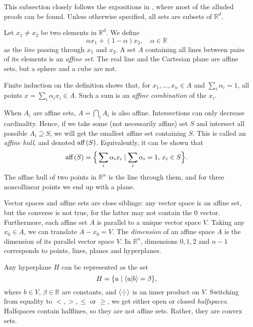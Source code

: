 		This subsection closely follows the expositions in \cite{rockafellar_convexanalysis_1970,grunbaum_convexpolytopes_2003,ziegler_lecturespolytopes_1995,boyd_convexoptimization_2004}, where most of the alluded proofs can be found. Unless otherwise specified, all sets are subsets of $\mathbb{R}^d$.

		Let $x_1 \neq x_2$ be two elements in $\mathbb{R}^d$. We define
		$$
			\alpha x_1 + (1 - \alpha) x_2, \quad\alpha \in \mathbb{R}
		$$
		as the \emph{line} passing through $x_1$ and $x_2$. A set $A$ containing all lines between pairs of its elements is an \emph{affine set}. The real line and the Cartesian plane are affine sets, but a sphere and a cube are not.

		Finite induction on the definition shows that, for $x_1, \ldots, x_n \in A$ and $\sum_i \alpha_i = 1$, all points $x = \sum_i \alpha_i x_i \in A$.  Such a sum is an \emph{affine combination} of the $x_i$.

		When $A_i$ are affine sets, $A = \bigcap_i A_i$ is also affine. Intersections can only decrease cardinality. Hence, if we take some (not necessarily affine) set $S$ and intersect all possible $A_i \supseteq S$, we will get the smallest affine set containing $S$. This is called an \emph{affine hull}, and denoted $\text{aff} \left( S \right)$. Equivalently, it can be shown that
		$$
			\text{aff} \left( S \right) = \Big\{ \sum_i \alpha_i x_i \mid \sum_i \alpha_i = 1, \, x_i \in S \Big\} .
		$$
		The affine hull of two points in $\mathbb{R}^n$ is the line through them, and for three noncollinear points we end up with a plane.

		Vector spaces and affine sets are close siblings: any vector space is an affine set, but the converse is not true, for the latter may not contain the $0$ vector. Furthermore, each affine set $A$ is parallel to a unique vector space $V$. Taking any $x_0 \in A$, we can translate $A - x_0 = V$. The \emph{dimension} of an affine space $A$ is the dimension of its parallel vector space $V$. In $\mathbb{R}^n$, dimensions $0, 1, 2$ and $n-1$ corresponds to points, lines, planes and hyperplanes.

		Any hyperplane $H$ can be represented as the set
		$$
			H = \{ u \mid \braket{u}{b} = \beta \} ,
		$$
		where $b \in V$, $\beta \in \mathbb{R}$ are constants, and $\braket{\cdot}{\cdot}$ is an inner product on $V$. Switching from equality to $<, >, \leq$ or $\geq$, we get either open or closed \emph{halfspaces}. Halfspaces contain halflines, so they are not affine sets. Rather, they are convex sets.

